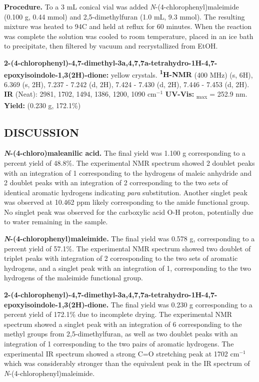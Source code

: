 \documentclass[11pt]{article}
\let\bf\textbf
\begin{document}
\bf{Procedure.} To a 3 mL conical vial was added \textit{N}-(4-chlorophenyl)maleimide (0.100 g, 0.44 mmol) and 2,5-dimethylfuran (1.0 mL, 9.3 mmol). The resulting mixture was heated to 94\degree C and held at reflux for 60 minutes. When the reaction was complete the solution was cooled to room temperature, placed in an ice bath to precipitate, then filtered by vacuum and recrystallized from EtOH. 

\bf{2-(4-chlorophenyl)-4,7-dimethyl-3a,4,7,7a-tetrahydro-1H-4,7-epoxyisoindole-1,3(2H)-dione:} yellow crystals. \bf{\textsuperscript{1}H-NMR} (400 MHz) \textdelta{} (s, 6H), 6.369 (s, 2H), 7.237 - 7.242 (d, 2H), 7.424 - 7.430 (d, 2H), 7.446 - 7.453 (d, 2H). \bf{IR} (Neat): 2981, 1702, 1494, 1386, 1200, 1090 cm$^{-1}$ \bf{UV-Vis:} \textlambda\textsubscript{max} = 252.9 nm. \bf{Yield:} (0.230 g, 172.1\%)

\subsection*{DISCUSSION}
\bf{\textit{N}-(4-chloro)maleanilic acid.} The final yield was 1.100 g corresponding to a percent yield of 48.8\%. The experimental NMR spectrum showed 2 doublet peaks with an integration of 1 corresponding to the hydrogens of maleic anhydride and 2 doublet peaks with an integration of 2 corresponding to the two sets of identical aromatic hydrogens indicating \textit{para} substitution. Another singlet peak was observed at 10.462 ppm likely corresponding to the amide functional group. No singlet peak was observed for the carboxylic acid O-H proton, potentially due to water remaining in the sample.

\bf{\textit{N}-(4-chlorophenyl)maleimide.} The final yield was 0.578 g, corresponding to a percent yield of 57.1\%. The experimental NMR spectrum showed two doublet of triplet peaks with integration of 2 corresponding to the two sets of aromatic hydrogens, and a singlet peak with an integration of 1, corresponding to the two hydrogens of the maleimide functional group. 

\bf{2-(4-chlorophenyl)-4,7-dimethyl-3a,4,7,7a-tetrahydro-1H-4,7-epoxyisoindole-1,3(2H)-dione.} The final yield was 0.230 g corresponding to a percent yield of 172.1\% due to incomplete drying. The experimental NMR spectrum showed a singlet peak with an integration of 6 corresponding to the methyl groups from 2,5-dimethylfuran, as well as two doublet peaks with an integration of 1 corresponding to the two pairs of aromatic hydrogens. The experimental IR spectrum showed a strong C=O stretching peak at 1702 cm$^{-1}$ which was considerably stronger than the equivalent peak in the IR spectrum of \textit{N}-(4-chlorophenyl)maleimide. 
\end{document}
